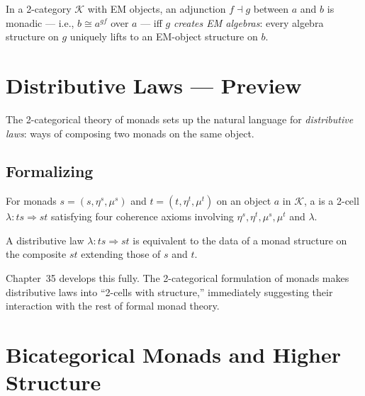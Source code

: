 \begin{theorem}
\label{thm:beck-formal}
In a 2-category $\mathcal{K}$ with EM objects, an adjunction $f \dashv g$
between $a$ and $b$ is monadic — i.e., $b \cong a^{gf}$ over $a$ — iff $g$
\emph{creates EM algebras}: every algebra structure on $g$ uniquely lifts to
an EM-object structure on $b$.
\end{theorem}


\section{Distributive Laws — Preview}
\label{sec:distributive-laws-preview}

The 2-categorical theory of monads sets up the natural language for
\emph{distributive laws}: ways of composing two monads on the same object.

\subsection{Formalizing}

\begin{definition}
\label{def:dist-law}
For monads $s = (s, \eta^s, \mu^s)$ and $t = (t, \eta^t, \mu^t)$ on an object
$a$ in $\mathcal{K}$, a  is a 2-cell
$\lambda : ts \Rightarrow st$ satisfying four coherence axioms involving
$\eta^s, \eta^t, \mu^s, \mu^t$ and $\lambda$.
\end{definition}

\begin{theorem}
\label{thm:dist-law-composite}
A distributive law $\lambda : ts \Rightarrow st$ is equivalent to the data
of a monad structure on the composite $st$ extending those of $s$ and $t$.
\end{theorem}

\begin{remark}
Chapter~35 develops this fully. The 2-categorical formulation of monads makes
distributive laws into ``2-cells with structure,'' immediately suggesting
their interaction with the rest of formal monad theory.
\end{remark}


\section{Bicategorical Monads and Higher Structure}
\label{sec:bicat-monads}

